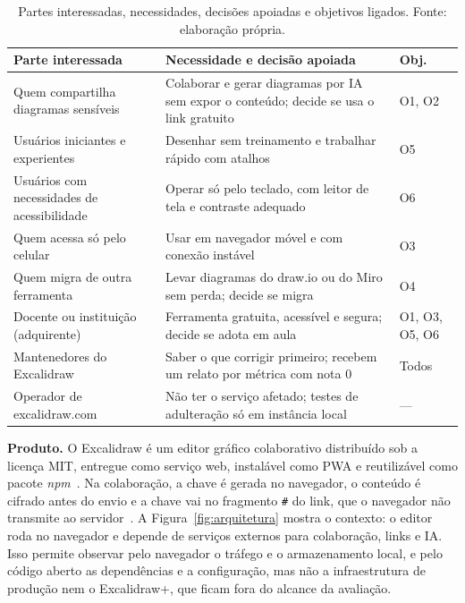\documentclass[conference]{IEEEtran}
\begin{document}
\begin{table}[!t]
\caption{Partes interessadas, necessidades, decisões apoiadas e objetivos ligados. Fonte: elaboração própria.}
\label{tab:stakeholders}
\centering
\scriptsize
\setlength{\tabcolsep}{2.5pt}
\begin{tabular}{@{}L{2.0cm} L{5.15cm} L{1.0cm}@{}}
\toprule
\textbf{Parte interessada} & \textbf{Necessidade e decisão apoiada} & \textbf{Obj.}\\
\midrule
Quem compartilha diagramas sensíveis & Colaborar e gerar diagramas por IA sem expor o conteúdo; decide se usa o link gratuito & O1, O2\\
Usuários iniciantes e experientes & Desenhar sem treinamento e trabalhar rápido com atalhos & O5\\
Usuários com necessidades de acessibilidade & Operar só pelo teclado, com leitor de tela e contraste adequado & O6\\
Quem acessa só pelo celular & Usar em navegador móvel e com conexão instável & O3\\
Quem migra de outra ferramenta & Levar diagramas do draw.io ou do Miro sem perda; decide se migra & O4\\
Docente ou instituição (adquirente) & Ferramenta gratuita, acessível e segura; decide se adota em aula & O1, O3, O5, O6\\
Mantenedores do Excalidraw & Saber o que corrigir primeiro; recebem um relato por métrica com nota 0 & Todos\\
Operador de excalidraw.com & Não ter o serviço afetado; testes de adulteração só em instância local & ---\\
\bottomrule
\end{tabular}
\end{table}

\textbf{Produto.} O Excalidraw é um editor gráfico colaborativo distribuído
sob a licença MIT, entregue como serviço web, instalável como PWA e
reutilizável como pacote \textit{npm}~\cite{excalidraw}. Na colaboração, a
chave é gerada no navegador, o conteúdo é cifrado antes do envio e a chave
vai no fragmento \texttt{\#} do link, que o navegador não transmite ao
servidor~\cite{excalidrawe2ee}. A Figura~\ref{fig:arquitetura} mostra o
contexto: o editor roda no navegador e depende de serviços externos para
colaboração, links e IA. Isso permite observar pelo navegador o tráfego e o
armazenamento local, e pelo código aberto as dependências e a configuração,
mas não a infraestrutura de produção nem o Excalidraw+, que ficam fora do
alcance da avaliação.
\end{document}

